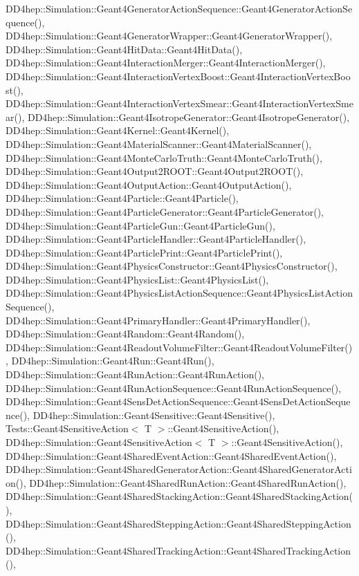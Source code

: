 D\+D4hep\+::\+Simulation\+::\+Geant4\+Generator\+Action\+Sequence\+::\+Geant4\+Generator\+Action\+Sequence(), D\+D4hep\+::\+Simulation\+::\+Geant4\+Generator\+Wrapper\+::\+Geant4\+Generator\+Wrapper(), D\+D4hep\+::\+Simulation\+::\+Geant4\+Hit\+Data\+::\+Geant4\+Hit\+Data(), D\+D4hep\+::\+Simulation\+::\+Geant4\+Interaction\+Merger\+::\+Geant4\+Interaction\+Merger(), D\+D4hep\+::\+Simulation\+::\+Geant4\+Interaction\+Vertex\+Boost\+::\+Geant4\+Interaction\+Vertex\+Boost(), D\+D4hep\+::\+Simulation\+::\+Geant4\+Interaction\+Vertex\+Smear\+::\+Geant4\+Interaction\+Vertex\+Smear(), D\+D4hep\+::\+Simulation\+::\+Geant4\+Isotrope\+Generator\+::\+Geant4\+Isotrope\+Generator(), D\+D4hep\+::\+Simulation\+::\+Geant4\+Kernel\+::\+Geant4\+Kernel(), D\+D4hep\+::\+Simulation\+::\+Geant4\+Material\+Scanner\+::\+Geant4\+Material\+Scanner(), D\+D4hep\+::\+Simulation\+::\+Geant4\+Monte\+Carlo\+Truth\+::\+Geant4\+Monte\+Carlo\+Truth(), D\+D4hep\+::\+Simulation\+::\+Geant4\+Output2\+R\+O\+O\+T\+::\+Geant4\+Output2\+R\+O\+O\+T(), D\+D4hep\+::\+Simulation\+::\+Geant4\+Output\+Action\+::\+Geant4\+Output\+Action(), D\+D4hep\+::\+Simulation\+::\+Geant4\+Particle\+::\+Geant4\+Particle(), D\+D4hep\+::\+Simulation\+::\+Geant4\+Particle\+Generator\+::\+Geant4\+Particle\+Generator(), D\+D4hep\+::\+Simulation\+::\+Geant4\+Particle\+Gun\+::\+Geant4\+Particle\+Gun(), D\+D4hep\+::\+Simulation\+::\+Geant4\+Particle\+Handler\+::\+Geant4\+Particle\+Handler(), D\+D4hep\+::\+Simulation\+::\+Geant4\+Particle\+Print\+::\+Geant4\+Particle\+Print(), D\+D4hep\+::\+Simulation\+::\+Geant4\+Physics\+Constructor\+::\+Geant4\+Physics\+Constructor(), D\+D4hep\+::\+Simulation\+::\+Geant4\+Physics\+List\+::\+Geant4\+Physics\+List(), D\+D4hep\+::\+Simulation\+::\+Geant4\+Physics\+List\+Action\+Sequence\+::\+Geant4\+Physics\+List\+Action\+Sequence(), D\+D4hep\+::\+Simulation\+::\+Geant4\+Primary\+Handler\+::\+Geant4\+Primary\+Handler(), D\+D4hep\+::\+Simulation\+::\+Geant4\+Random\+::\+Geant4\+Random(), D\+D4hep\+::\+Simulation\+::\+Geant4\+Readout\+Volume\+Filter\+::\+Geant4\+Readout\+Volume\+Filter(), D\+D4hep\+::\+Simulation\+::\+Geant4\+Run\+::\+Geant4\+Run(), D\+D4hep\+::\+Simulation\+::\+Geant4\+Run\+Action\+::\+Geant4\+Run\+Action(), D\+D4hep\+::\+Simulation\+::\+Geant4\+Run\+Action\+Sequence\+::\+Geant4\+Run\+Action\+Sequence(), D\+D4hep\+::\+Simulation\+::\+Geant4\+Sens\+Det\+Action\+Sequence\+::\+Geant4\+Sens\+Det\+Action\+Sequence(), D\+D4hep\+::\+Simulation\+::\+Geant4\+Sensitive\+::\+Geant4\+Sensitive(), Tests\+::\+Geant4\+Sensitive\+Action$<$ T $>$\+::\+Geant4\+Sensitive\+Action(), D\+D4hep\+::\+Simulation\+::\+Geant4\+Sensitive\+Action$<$ T $>$\+::\+Geant4\+Sensitive\+Action(), D\+D4hep\+::\+Simulation\+::\+Geant4\+Shared\+Event\+Action\+::\+Geant4\+Shared\+Event\+Action(), D\+D4hep\+::\+Simulation\+::\+Geant4\+Shared\+Generator\+Action\+::\+Geant4\+Shared\+Generator\+Action(), D\+D4hep\+::\+Simulation\+::\+Geant4\+Shared\+Run\+Action\+::\+Geant4\+Shared\+Run\+Action(), D\+D4hep\+::\+Simulation\+::\+Geant4\+Shared\+Stacking\+Action\+::\+Geant4\+Shared\+Stacking\+Action(), D\+D4hep\+::\+Simulation\+::\+Geant4\+Shared\+Stepping\+Action\+::\+Geant4\+Shared\+Stepping\+Action(), D\+D4hep\+::\+Simulation\+::\+Geant4\+Shared\+Tracking\+Action\+::\+Geant4\+Shared\+Tracking\+Action(), 